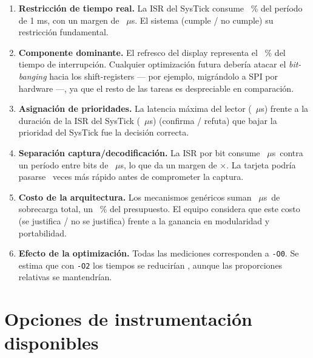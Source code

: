 \documentclass[11pt,a4paper]{article}
\newcommand{\dato}[1][2cm]{\underline{\hspace{#1}}}
\newcommand{\us}{\ensuremath{\mu}s}
\begin{document}
\begin{enumerate}
  \item \textbf{Restricción de tiempo real.} La ISR del SysTick consume
        \dato\ \% del período de 1 ms, con un margen de \dato\ \us. El sistema
        \dato{} (cumple / no cumple) su restricción fundamental.

  \item \textbf{Componente dominante.} El refresco del display representa el
        \dato\ \% del tiempo de interrupción. Cualquier optimización futura
        debería atacar el \textit{bit-banging} hacia los shift-registers ---
        por ejemplo, migrándolo a SPI por hardware ---, ya que el resto de las
        tareas es despreciable en comparación.

  \item \textbf{Asignación de prioridades.} La latencia máxima del lector
        (\dato\ \us) frente a la duración de la ISR del SysTick (\dato\ \us)
        \dato{} (confirma / refuta) que bajar la prioridad del SysTick fue la
        decisión correcta.

  \item \textbf{Separación captura/decodificación.} La ISR por bit consume
        \dato\ \us\ contra un período entre bits de \dato\ \us, lo que da un
        margen de \dato$\times$. La tarjeta podría pasarse \dato\ veces más
        rápido antes de comprometer la captura.

  \item \textbf{Costo de la arquitectura.} Los mecanismos genéricos suman
        \dato\ \us\ de sobrecarga total, un \dato\ \% del presupuesto. El
        equipo considera que este costo \dato{} (se justifica / no se
        justifica) frente a la ganancia en modularidad y portabilidad.

  \item \textbf{Efecto de la optimización.} Todas las mediciones corresponden
        a \texttt{-O0}. Se estima que con \texttt{-O2} los tiempos se
        reducirían \dato{}, aunque las proporciones relativas se mantendrían.
\end{enumerate}

\appendix
\newpage
\section{Opciones de instrumentación disponibles}
\end{document}
